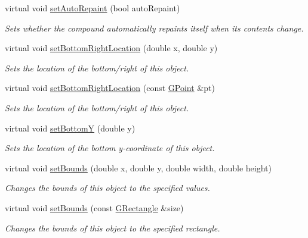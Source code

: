 \begin{DoxyCompactItemize}
virtual void \mbox{\hyperlink{classsgl_1_1GCompound_adf10848319457bd6df4c657bf8872bee}{set\+Auto\+Repaint}} (bool auto\+Repaint)
\begin{DoxyCompactList}\small\item\em Sets whether the compound automatically repaints itself when its contents change. \end{DoxyCompactList}\item 
virtual void \mbox{\hyperlink{classsgl_1_1GObject_a71ff7b16b8f1bdc4a1ce9f30cf8b87d8}{set\+Bottom\+Right\+Location}} (double x, double y)
\begin{DoxyCompactList}\small\item\em Sets the location of the bottom/right of this object. \end{DoxyCompactList}\item 
virtual void \mbox{\hyperlink{classsgl_1_1GObject_ac6f7320321182f1d18c1c0fa97d5e941}{set\+Bottom\+Right\+Location}} (const \mbox{\hyperlink{structsgl_1_1GPoint}{G\+Point}} \&pt)
\begin{DoxyCompactList}\small\item\em Sets the location of the bottom/right of this object. \end{DoxyCompactList}\item 
virtual void \mbox{\hyperlink{classsgl_1_1GObject_a4b20e93c2a2597484f74ee5caa71f41f}{set\+BottomY}} (double y)
\begin{DoxyCompactList}\small\item\em Sets the location of the bottom y-\/coordinate of this object. \end{DoxyCompactList}\item 
virtual void \mbox{\hyperlink{classsgl_1_1GObject_a2aae8197624b72265ab83b4f1bc73f2f}{set\+Bounds}} (double x, double y, double width, double height)
\begin{DoxyCompactList}\small\item\em Changes the bounds of this object to the specified values. \end{DoxyCompactList}\item 
virtual void \mbox{\hyperlink{classsgl_1_1GObject_acada386653f008cacc7cce86426bef7c}{set\+Bounds}} (const \mbox{\hyperlink{structsgl_1_1GRectangle}{G\+Rectangle}} \&size)
\begin{DoxyCompactList}\small\item\em Changes the bounds of this object to the specified rectangle. \end{DoxyCompactList}\item 

\end{DoxyCompactItemize}
